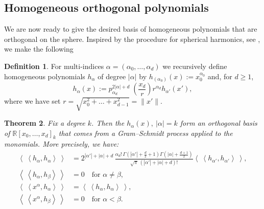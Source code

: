 \documentclass{amsart}
\newcommand{\p}[2]{p_{#1}^{#2}\;\!\!}
\newcommand{\coloneqq}{:=}
\newcommand{\bra}{\left<\!\!\!\:\left<}
\newcommand{\ket}{\right>\!\!\!\:\right>}
\newcommand{\R}{\mathbb{R}}
\theoremstyle{plain}
\newtheorem{theorem}{Theorem}[section]
\theoremstyle{definition}
\newtheorem{definition}[theorem]{Definition}
\theoremstyle{remark}
\begin{document}
\subsection{Homogeneous orthogonal polynomials} \label{hsection}
We are now ready to give the desired basis of homogeneous polynomials that are orthogonal on the sphere. Inspired by the procedure for spherical harmonics, see \cite[p.~35]{Dunkl}, we make the following
\begin{definition} \label{hdef}
For multi-indices $\alpha=(\alpha_0,\ldots,\alpha_d)$ we recursively define homogeneous polynomials $h_\alpha$ of degree $|\alpha |$ by $h_{(\alpha_0)}(x) \coloneqq x_0^{\alpha_0}$ and, for $d\geq 1$,
$$
h_\alpha(x) \coloneqq \p{\alpha_d}{2|\alpha |+d}\left(\frac{x_d}{r}\right) r^{\alpha_d}h_{\alpha'}(x'),
$$
where we have set $r=\sqrt{x_0^2 +\ldots+x_{d-1}^2}=\|x'\|$.
\end{definition}
\begin{theorem} Fix a degree $k$.
Then the $h_\alpha(x),\ |\alpha|=k$ form an orthogonal basis of $\R[x_0,\ldots,x_d]_k$ that comes from a Gram--Schmidt process applied to the monomials. More precisely, we have:
\begin{align} \label{hth1}
\bra h_\alpha ,h_\alpha \ket &= 2^{|\alpha '|+|\alpha |+d}\,
\frac{\alpha_d!\,\Gamma\!\left(|\alpha '|+\frac{d}{2}+1\right)\Gamma\!\left(|\alpha |+\frac{d+1}{2}\right)}{\sqrt{\pi}\,\left(|\alpha '|+|\alpha |+d\right)!}\bra h_{\alpha '},h_{\alpha '}\ket ,\\
\label{hth2}
\bra h_\alpha,h_\beta \ket &= 0 \quad\text{for }\alpha\neq\beta,\\
\label{hth3}
\bra x^\alpha, h_\alpha \ket &= \bra h_\alpha ,h_\alpha \ket ,\\
\label{hth4}
\bra x^\alpha,h_\beta \ket &= 0 \quad\text{for }\alpha < \beta.
\end{align}
\end{theorem}
\end{document}

